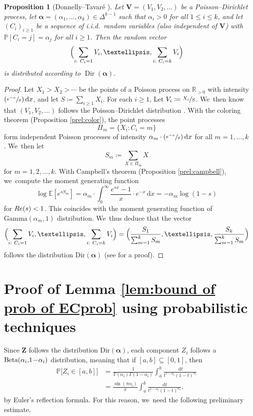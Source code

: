 \documentclass[10pt,a4paper]{article}
\newcommand{\bV}{{\boldsymbol V}}
\newcommand{\bZ}{{\boldsymbol Z}}
\newcommand{\Psfrac}[2]{(\sfrac{#1}{#2})}
\newcommand{\RR}{\mathbb{R}}
\newcommand{\PP}{\mathbb{P}}
\newcommand{\EE}{\mathbb{E}}
\newcommand{\boldalpha}{\boldsymbol{\alpha}}
\newcommand{\dee}{\,\mathrm{d}}
\newcommand{\riemint}[4]{\int_{#1}^{#2}\! #3 \, \mathrm{d}#4}
\renewcommand{\Re}{\textup{Re}}
\newcommand{\simplex}{\Delta^{k-1}}
\newcommand{\bg}{\big}
\DeclareMathOperator{\Dir}{Dir}
\theoremstyle{plain}
\newtheorem{prop}[cor]{Proposition}
\theoremstyle{definition}
\begin{document}
\begin{prop}[Donnelly--Tavaré \cite{DonnellyTavare87}]
\label{prop:probabilistic dirichlet law}
Let $\bV = (V_1, V_2, \ldots)$ be a Poisson--Dirichlet process, let $\boldalpha = (\alpha_1, \ldots, \alpha_k) \in \simplex$ such that $\alpha_i > 0$ for all $1 \le i \le k$, and let $(C_i)_{i \ge 1}$ be a sequence of i.i.d.~random variables (also independent of $\bV$) with $\PP[C_i = j] = \alpha_j$ for all $i \ge 1$. Then the random vector
\[
\Bigl(\sum_{i:\ C_i = 1} V_i, \ldots, \sum_{i:\ C_i = k} V_i\Bigr)
\]
is distributed according to $\Dir(\boldalpha)$.
\end{prop}

\begin{proof}
Let $X_1 > X_2 > \cdots$ be the points of a Poisson process on $\RR_{>0}$ with intensity $\Psfrac{e^{-x}}{x} \, \mathrm dx$, and let $S \coloneqq \sum_{i \ge 1} X_i$. For each $i \ge 1$, Let $V_i \coloneqq \sfrac{X_i}{S}$. We~then know that $(V_1, V_2, \ldots)$ follows the Poisson--Dirichlet distribution \cite[Th.\,2.2]{Feng10}. With the coloring theorem (Proposition \ref{prel:color}), the point processes
\[
\Pi_m = \{X_i : C_i = m\}
\]
form independent Poisson processes of intensity $\alpha_m\cdot \Psfrac{e^{-x}}{x} \, \mathrm dx$ for all $m = 1, \ldots, k$. We~then let
\[
S_m \coloneqq \sum_{X \in \Pi_m} X
\]
for $m=1,2,\dots,k$. With Campbell's theorem (Proposition \ref{prel:campbell}), we~compute the moment generating function
\[
\log \EE[e^{sS_m}] = \alpha_m\cdot \riemint{0}{\infty}{\frac{e^{sx}-1}{x}\cdot e^{-x}}{x} = -\alpha_m\log(1-s)
\]
for $\Re(s) < 1$. This coincides with the moment generating function of $\text{Gamma}(\alpha_m, 1)$ distribution. We~thus deduce that the vector
\[
\Bigl(\sum_{i:\ C_i = 1} V_i, \ldots, \sum_{i:\ C_i = k} V_i \Bigr) = \Bigl(\frac{S_1}{\sum_{m=1}^k S_m}, \ldots, \frac{S_k}{\sum_{m=1}^k S_m} \Bigr)
\]
follows the distribution $\text{Dir}(\boldalpha)$ (see \cite[Ch.\,49, pp.\,485-487]{KotzBal00} for a proof).
\end{proof}

\section{Proof of Lemma \ref{lem:bound of prob of ECprob} using probabilistic techniques}\label{sec:boundary event Prob}

Since $\bZ$ follows the distribution $\text{Dir}(\boldalpha)$, each component $Z_i$ follows a \hbox{$\text{Beta}(\alpha_i,\mkern-3mu 1 \!-\! \alpha_i)$} distribution, meaning that if $[a,b]\subseteq[0,1]$, then
\begin{equation}
\label{eq:Zi distribution}
\begin{aligned}
\PP\bg[Z_i\in[a,b] \bg] &= \frac{1}{\Gamma(\alpha_i)\Gamma(1-\alpha_i)}\int_a^b \frac{\dee t}{t^{1-\alpha_i} (1-t)^{\alpha_i}}\\
&= \frac{\sin(\pi\alpha_i)}{\pi} \int_a^b \frac{\dee t}{t^{1-\alpha_i} (1-t)^{\alpha_i}},
\end{aligned}
\end{equation}
by Euler's reflection formula. For this reason, we~need the following preliminary estimate.
\end{document}
